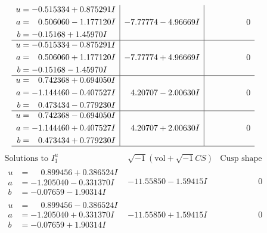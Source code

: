 \documentclass[1p]{elsarticle_modified}
\theoremstyle{definition}
\newcommand{\I}{\sqrt{-1}}
\begin{document}
$$\begin{array}{c|c|c}
\begin{aligned}
u &= -0.515334 + 0.875291 I \\
a &= \phantom{-}0.506060 - 1.177120 I \\
b &= -0.15168 + 1.45970 I\end{aligned}
 & -7.77774 - 4.96669 I & \phantom{-0.000000 } 0 \\ \hline\begin{aligned}
u &= -0.515334 - 0.875291 I \\
a &= \phantom{-}0.506060 + 1.177120 I \\
b &= -0.15168 - 1.45970 I\end{aligned}
 & -7.77774 + 4.96669 I & \phantom{-0.000000 } 0 \\ \hline\begin{aligned}
u &= \phantom{-}0.742368 + 0.694050 I \\
a &= -1.144460 - 0.407527 I \\
b &= \phantom{-}0.473434 - 0.779230 I\end{aligned}
 & \phantom{-}4.20707 - 2.00630 I & \phantom{-0.000000 } 0 \\ \hline\begin{aligned}
u &= \phantom{-}0.742368 - 0.694050 I \\
a &= -1.144460 + 0.407527 I \\
b &= \phantom{-}0.473434 + 0.779230 I\end{aligned}
 & \phantom{-}4.20707 + 2.00630 I & \phantom{-0.000000 } 0\\
 \hline 
 \end{array}$$\newpage$$\begin{array}{c|c|c}  
\text{Solutions to }I^u_{1}& \I (\text{vol} + \sqrt{-1}CS) & \text{Cusp shape}\\
 \hline 
\begin{aligned}
u &= \phantom{-}0.899456 + 0.386524 I \\
a &= -1.205040 - 0.331370 I \\
b &= -0.07659 - 1.90314 I\end{aligned}
 & -11.55850 - 1.59415 I & \phantom{-0.000000 } 0 \\ \hline\begin{aligned}
u &= \phantom{-}0.899456 - 0.386524 I \\
a &= -1.205040 + 0.331370 I \\
b &= -0.07659 + 1.90314 I\end{aligned}
 & -11.55850 + 1.59415 I & \phantom{-0.000000 } 0 \\ \hline\begin{aligned}

\end{aligned}
\end{array}$$
\end{document}
